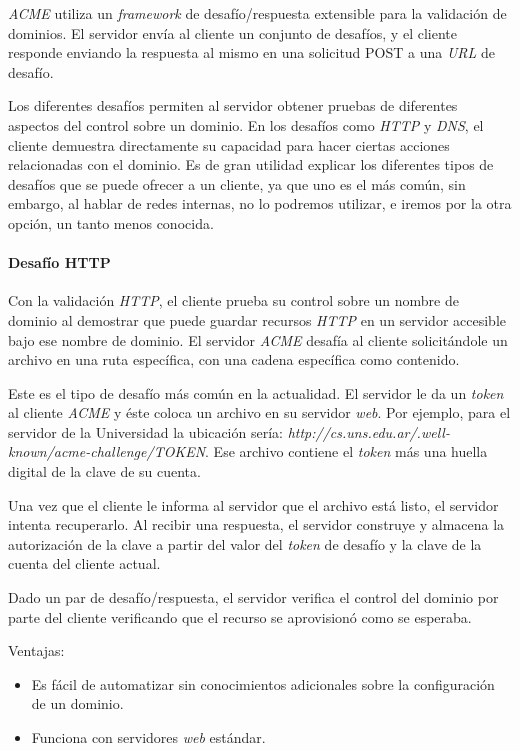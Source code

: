 \emph{ACME} utiliza un \emph{framework} de desafío/respuesta extensible para la validación 
de dominios. El servidor envía al cliente un conjunto de desafíos, y el cliente 
responde enviando la respuesta al mismo en una solicitud POST a una \emph{URL} de desafío.

Los diferentes desafíos permiten al servidor obtener pruebas de diferentes 
aspectos del control sobre un dominio. En los desafíos como \emph{HTTP} y 
\emph{DNS}, el cliente demuestra directamente su capacidad para hacer ciertas 
acciones relacionadas con el dominio. Es de gran utilidad explicar los 
diferentes tipos de desafíos que se puede ofrecer a un cliente, ya que uno 
es el más común, sin embargo, al hablar de redes internas, no lo podremos 
utilizar, e iremos por la otra opción, un tanto menos conocida.


\paragraph*{Desafío HTTP}

Con la validación \emph{HTTP}, el cliente prueba su control sobre un nombre de dominio al 
demostrar que puede guardar recursos \emph{HTTP} en un servidor accesible bajo ese nombre 
de dominio. El servidor \emph{ACME} desafía al cliente solicitándole un archivo en una ruta 
específica, con una cadena específica como contenido.

Este es el tipo de desafío más común en la actualidad. El servidor le da un \emph{token} 
al cliente \emph{ACME} y éste coloca un archivo en su servidor \emph{web}. Por 
ejemplo, para el servidor de la Universidad la ubicación sería:
\textit{http://cs.uns.edu.ar/.well-known/acme-challenge/\emph{TOKEN}}. Ese archivo contiene 
el \emph{token} más una huella digital de la clave de su cuenta.

Una vez que el cliente le informa al servidor que el archivo está listo, el servidor 
intenta recuperarlo. Al recibir una respuesta, el servidor construye y almacena la 
autorización de la clave a partir del valor del \emph{token} de desafío y la clave de 
la cuenta del cliente actual.

Dado un par de desafío/respuesta, el servidor verifica el control del dominio por 
parte del cliente verificando que el recurso se aprovisionó como se esperaba.

Ventajas:
\begin{itemize}
   \setlength\itemsep{-0.6em}
   \item Es fácil de automatizar sin conocimientos adicionales sobre la configuración de un dominio.
   \item Funciona con servidores \emph{web} estándar.
\end{itemize}

